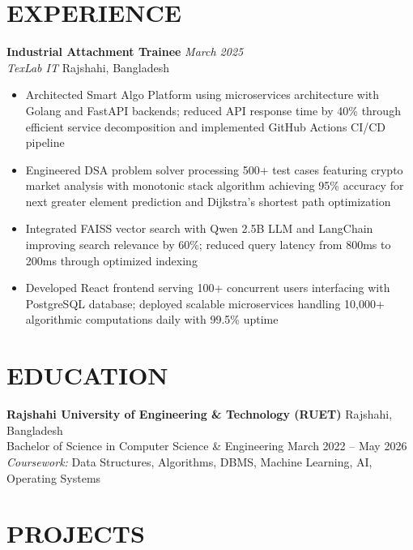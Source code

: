 \section*{EXPERIENCE}
\vspace{-2pt}

\textbf{Industrial Attachment Trainee} \hfill \textit{March 2025}\\
\textit{TexLab IT} \hfill Rajshahi, Bangladesh
\vspace{-2pt}
\begin{itemize}[itemsep=0.5pt]
    \item Architected Smart Algo Platform using microservices architecture with Golang and FastAPI backends; reduced API response time by 40\% through efficient service decomposition and implemented GitHub Actions CI/CD pipeline
    \item Engineered DSA problem solver processing 500+ test cases featuring crypto market analysis with monotonic stack algorithm achieving 95\% accuracy for next greater element prediction and Dijkstra's shortest path optimization
    \item Integrated FAISS vector search with Qwen 2.5B LLM and LangChain improving search relevance by 60\%; reduced query latency from 800ms to 200ms through optimized indexing
    \item Developed React frontend serving 100+ concurrent users interfacing with PostgreSQL database; deployed scalable microservices handling 10,000+ algorithmic computations daily with 99.5\% uptime
\end{itemize}
\vspace{0pt}

\section*{EDUCATION}
\vspace{-2pt}

\textbf{Rajshahi University of Engineering \& Technology (RUET)} \hfill Rajshahi, Bangladesh\\
Bachelor of Science in Computer Science \& Engineering \hfill March 2022 -- May 2026\\
\textit{Coursework: } Data Structures, Algorithms, DBMS, Machine Learning, AI, Operating Systems
\vspace{1pt}

\section*{PROJECTS}
\vspace{-2pt}

